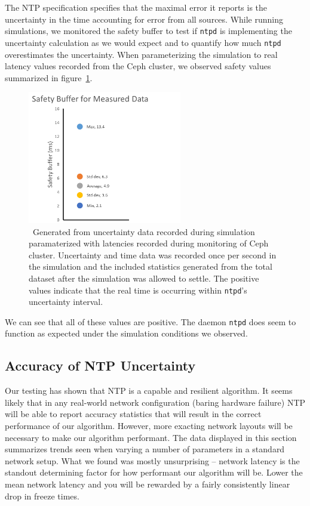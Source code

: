 The NTP specification specifies that the maximal error it reports is the 
uncertainty in the time accounting for error from all sources.
While running simulations, we monitored the safety buffer to test if 
\texttt{ntpd} is implementing the uncertainty calculation as we would expect
and to quantify how much \texttt{ntpd} overestimates the uncertainty.
When parameterizing the simulation to real latency values recorded from the 
Ceph cluster, we observed safety values summarized in figure~\ref{fig:safety-data}.

\begin{figure}[h]
  \caption{~Generated from uncertainty data recorded during simulation paramaterized
  with latencies recorded during monitoring of Ceph cluster. Uncertainty and time
  data was recorded once per second in the simulation and the included statistics 
  generated from the total dataset after the simulation was allowed to settle. 
  The positive values indicate that the real time is occurring within \texttt{ntpd}'s 
  uncertainty interval.}
  \label{fig:safety-data}
  \centering
  \includegraphics[width=0.6\textwidth]{5pointsSafety.png}
\end{figure}

We can see that all of these values are positive. The daemon \texttt{ntpd} 
does seem to function as expected under the simulation conditions we observed. 

\subsection{Accuracy of NTP Uncertainty}

Our testing has shown that NTP is a capable and resilient
algorithm. It seems likely that in any real-world network
configuration (baring hardware failure) NTP will be able to report
accuracy statistics that will result in the correct performance of our
algorithm. However, more exacting network layouts will be necessary to
make our algorithm performant. The data displayed in this section
summarizes trends seen when varying a number of parameters in a
standard network setup. What we found was mostly unsurprising --
network latency is the standout determining factor for how performant
our algorithm will be. Lower the mean network latency and you will be
rewarded by a fairly consistently linear drop in freeze times.

